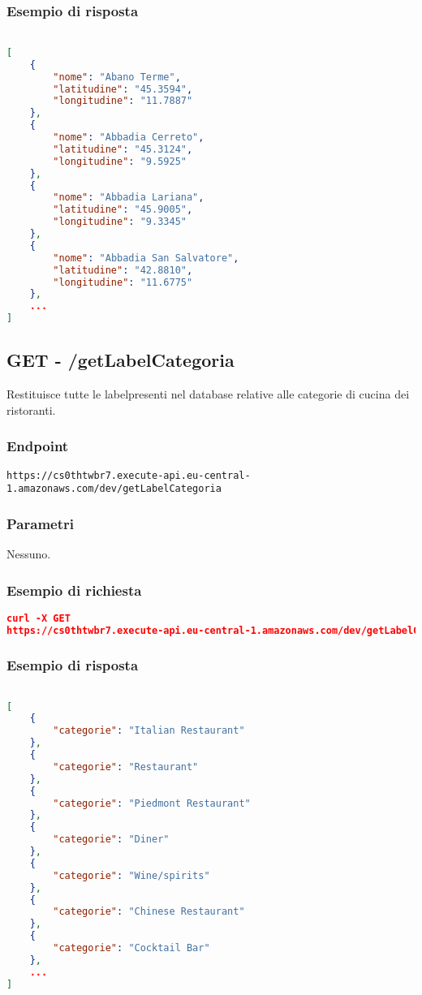\subsubsection{Esempio di risposta}
\begin{lstlisting}[language=json, caption={Esempio di richiesta \texttt{/getCities}}, captionpos=b]

[
    {
        "nome": "Abano Terme",
        "latitudine": "45.3594",
        "longitudine": "11.7887"
    },
    {
        "nome": "Abbadia Cerreto",
        "latitudine": "45.3124",
        "longitudine": "9.5925"
    },
    {
        "nome": "Abbadia Lariana",
        "latitudine": "45.9005",
        "longitudine": "9.3345"
    },
    {
        "nome": "Abbadia San Salvatore",
        "latitudine": "42.8810",
        "longitudine": "11.6775"
    },
    ...
]
\end{lstlisting}

\pagebreak




\subsection{GET - /getLabelCategoria} 
Restituisce tutte le label\glo presenti nel database relative alle categorie di cucina dei ristoranti.


\subsubsection{Endpoint}
\texttt{https://cs0thtwbr7.execute-api.eu-central-1.amazonaws.com/dev/getLabelCategoria}

\subsubsection{Parametri}
Nessuno.

\subsubsection{Esempio di richiesta}
\begin{lstlisting}[language=json, caption={Esempio di richiesta \texttt{/getLabelCategoria}}, captionpos=b]
curl -X GET 
https://cs0thtwbr7.execute-api.eu-central-1.amazonaws.com/dev/getLabelCategoria

\end{lstlisting}

\subsubsection{Esempio di risposta}
\begin{lstlisting}[language=json, caption={Esempio di richiesta \texttt{/getLabelCategoria}}, captionpos=b]

[
	{
        "categorie": "Italian Restaurant"
    },
    {
        "categorie": "Restaurant"
    },
    {
        "categorie": "Piedmont Restaurant"
    },
    {
        "categorie": "Diner"
    },
    {
        "categorie": "Wine/spirits"
    },
    {
        "categorie": "Chinese Restaurant"
    },
    {
        "categorie": "Cocktail Bar"
    },
    ...
]
\end{lstlisting}

